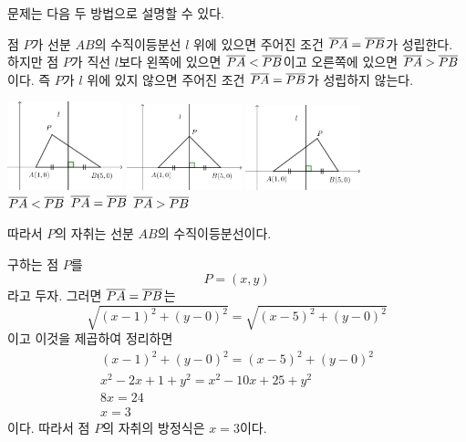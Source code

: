 \documentclass{oblivoir}
\begin{document}
\newpage
{} 문제는 다음 두 방법으로 설명할 수 있다.
\begin{mdframed}[frametitle=풀이1]
점 \(P\)가 선분 \(AB\)의 수직이등분선 \(l\) 위에 있으면 주어진 조건 \(\overline{PA}=\overline{PB}\)가 성립한다.
하지만 점 \(P\)가 직선 \(l\)보다 왼쪽에 있으면 \(\overline{PA}<\overline{PB}\)이고 오른쪽에 있으면 \(\overline{PA}>\overline{PB}\)이다.
즉 \(P\)가 \(l\) 위에 있지 않으면 주어진 조건 \(\overline{PA}=\overline{PB}\)가 성립하지 않는다.
\begin{center}
\includegraphics[width=0.25\textwidth]{trace_1-1}\qquad
\includegraphics[width=0.25\textwidth]{trace_1-2}\qquad
\includegraphics[width=0.25\textwidth]{trace_1-3}\\
\(\overline{PA}<\overline{PB}\)\qquad\qquad\qquad
\(\overline{PA}=\overline{PB}\)\qquad\qquad\qquad
\(\overline{PA}>\overline{PB}\)
\end{center}
따라서 \(P\)의 자취는 선분 \(AB\)의 수직이등분선이다.
\end{mdframed}

\begin{mdframed}[frametitle=풀이2]
구하는 점 \(P\)를
\[P=(x,y)\]
라고 두자.
그러면 \(\overline{PA}=\overline{PB}\)는
\[\sqrt{(x-1)^2+(y-0)^2}=\sqrt{(x-5)^2+(y-0)^2}\]
이고 이것을 제곱하여 정리하면
\begin{gather*}
(x-1)^2+(y-0)^2=(x-5)^2+(y-0)^2\\
x^2-2x+1+y^2=x^2-10x+25+y^2\\
8x=24\\
x=3
\end{gather*}
이다.
따라서 점 \(P\)의 자취의 방정식은 \(x=3\)이다.
\end{mdframed}
\end{document}
